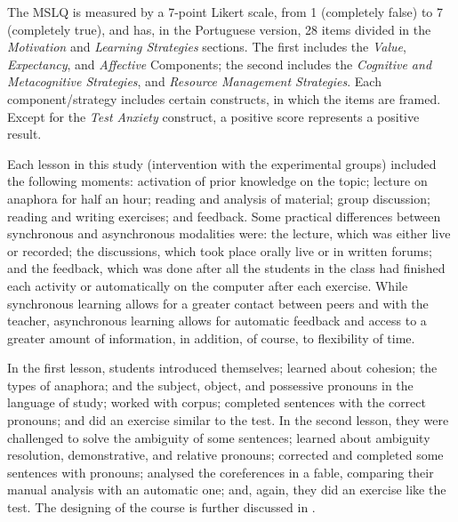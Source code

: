\documentclass{textolivre}
\begin{document}
The MSLQ is measured by a 7-point Likert scale, from 1 (completely
false) to 7 (completely true), and has, in the Portuguese version, 28
items divided in the \emph{Motivation} and \emph{Learning Strategies}
sections. The first includes the \emph{Value}, \emph{Expectancy}, and
\emph{Affective} Components; the second includes the \emph{Cognitive and
Metacognitive Strategies}, and \emph{Resource Management Strategies}.
Each component/strategy includes certain constructs, in which the items
are framed. Except for the \emph{Test Anxiety} construct, a positive
score represents a positive result.

Each lesson in this study (intervention
with the experimental groups) included the following moments: activation
of prior knowledge on the topic; lecture on anaphora for half an hour;
reading and analysis of material; group discussion; reading and writing
exercises; and feedback. Some practical differences between synchronous
and asynchronous modalities were: the lecture, which was either live or
recorded; the discussions, which took place orally live or in written
forums; and the feedback, which was done after all the students in the
class had finished each activity or automatically on the computer after
each exercise. While synchronous learning allows for a greater contact
between peers and with the teacher, asynchronous learning allows for
automatic feedback and access to a greater amount of information, in
addition, of course, to flexibility of time.

In the first lesson, students introduced themselves; learned about
cohesion; the types of anaphora; and the subject, object, and possessive
pronouns in the language of study; worked with corpus; completed
sentences with the correct pronouns; and did an exercise similar to the
test. In the second lesson, they were challenged to solve the ambiguity
of some sentences; learned about ambiguity resolution, demonstrative,
and relative pronouns; corrected and completed some sentences with
pronouns; analysed the coreferences in a fable, comparing their manual
analysis with an automatic one; and, again, they did an exercise like
the test. The designing of the course is further discussed in \textcite{bruscato_designing_2021}.
\end{document}
